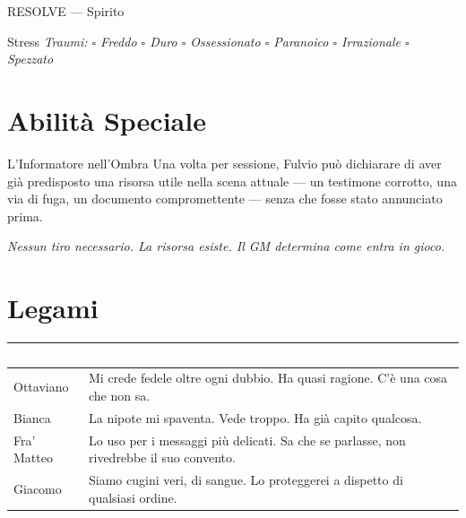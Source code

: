 \begin{attributoblock}[DoriaBlue]{RESOLVE — Spirito}
  \end{attributoblock}

\medskip
\begin{pgclockbox}{Stress \hfill {}}
  \small\textit{Traumi: $\square$ Freddo \quad $\square$ Duro \quad $\square$ Ossessionato \quad $\square$ Paranoico \quad $\square$ Irrazionale \quad $\square$ Spezzato}
\end{pgclockbox}

\section*{Abilità Speciale}
\begin{doriabox}{L'Informatore nell'Ombra}
  Una volta per sessione, Fulvio può dichiarare di aver già predisposto una
  risorsa utile nella scena attuale — un testimone corrotto, una via di fuga,
  un documento compromettente — senza che fosse stato annunciato prima.

  \medskip\noindent\textit{Nessun tiro necessario. La risorsa esiste. Il GM determina come entra in gioco.}
\end{doriabox}

\section*{Legami}
\begin{table}[h]
\centering\renewcommand{\arraystretch}{1.4}
\begin{tabularx}{\linewidth}{@{}L{2.4cm} X@{}}
  \toprule{}
  \textcolor{white}{\textbf{PG}} & \textcolor{white}{\textbf{Legame}} \\
  \midrule
  Ottaviano & Mi crede fedele oltre ogni dubbio. Ha quasi ragione. C'è una cosa che non sa. \\
  Bianca & La nipote mi spaventa. Vede troppo. Ha già capito qualcosa. \\
  Fra' Matteo & Lo uso per i messaggi più delicati. Sa che se parlasse, non rivedrebbe il suo convento. \\
  Giacomo & Siamo cugini veri, di sangue. Lo proteggerei a dispetto di qualsiasi ordine. \\
  \bottomrule
\end{tabularx}
\end{table}

